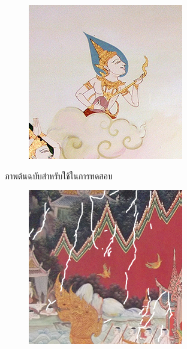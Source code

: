 \documentclass[xcolor=dvipsnames, xetex,serif]{beamer}
\numberwithin{equation}{section}
\begin{document}
\begin{frame}
\begin{figure}[H]
\begin{subfigure}{0.15\linewidth}
            \end{subfigure}
            \begin{subfigure}{0.15\linewidth}
                \centering
                \includegraphics[width=0.9\linewidth]{images/thaiart/case05-original.png}
            \end{subfigure}
            \caption{ภาพต้นฉบับสำหรับใช้ในการทดสอบ}
        \end{figure}
        \begin{figure}[H]
            \centering
            \begin{subfigure}{0.15\linewidth}
                \centering
                \includegraphics[width=0.9\linewidth]{images/thaiart/case01-toinpaint.png}

\end{subfigure}
\end{figure}
\end{frame}
\end{document}
